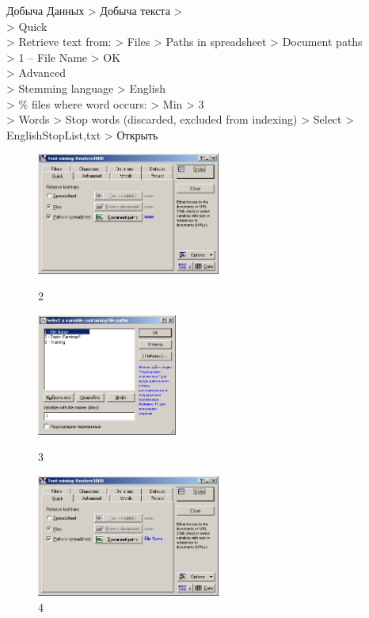 \newpage

Добыча Данных > Добыча текста > \\
> Quick \\
> Retrieve text from: > Files > Paths in spreadsheet > Document paths \\
> 1 – File Name > OK \\
> Advanced \\
> Stemming language > English \\
> \% files where word occurs: > Min > 3 \\
> Words > Stop words (discarded, excluded from indexing) > Select > EnglishStopList,txt > Открыть \\

\begin{figure}[!h]
  \centering

  \begin{minipage}{0.32\textwidth}
    \centering

    \includegraphics[height=4cm]
    {inc/2.PNG}

    \caption{2}

    \label{fig:2}
  \end{minipage}
  \begin{minipage}{0.32\textwidth}
    \centering

    \includegraphics[height=4cm]
    {inc/3.PNG}

    \caption{3}

    \label{fig:3}
  \end{minipage}
  \begin{minipage}{0.32\textwidth}
    \centering

    \includegraphics[height=4cm]
    {inc/4.PNG}

    \caption{4}

    \label{fig:4}
  \end{minipage}
\end{figure}

